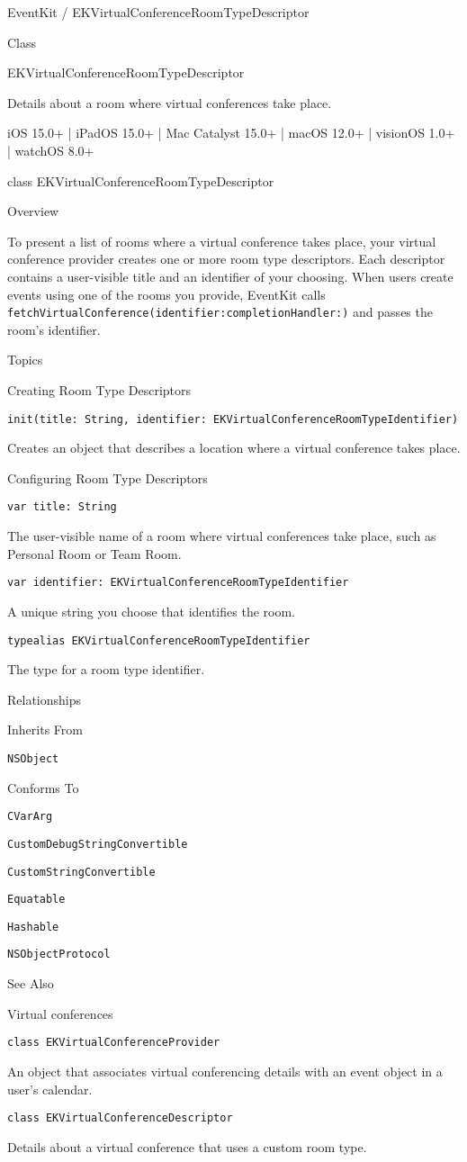 \documentclass{article}
\title{}
\author{}
\date{}
\begin{document}
EventKit / EKVirtualConferenceRoomTypeDescriptor

Class

EKVirtualConferenceRoomTypeDescriptor

Details about a room where virtual conferences take place.

iOS 15.0+ | iPadOS 15.0+ | Mac Catalyst 15.0+ | macOS 12.0+ | visionOS 1.0+ | watchOS 8.0+

class EKVirtualConferenceRoomTypeDescriptor

Overview

To present a list of rooms where a virtual conference takes place, your virtual conference provider creates one or more room type descriptors. Each descriptor contains a user-visible title and an identifier of your choosing. When users create events using one of the rooms you provide, EventKit calls \texttt{fetchVirtualConference(identifier:completionHandler:)} and passes the room's identifier.

Topics

Creating Room Type Descriptors

\texttt{init(title: String, identifier: EKVirtualConferenceRoomTypeIdentifier)}

Creates an object that describes a location where a virtual conference takes place.

Configuring Room Type Descriptors

\texttt{var title: String}

The user-visible name of a room where virtual conferences take place, such as Personal Room or Team Room.

\texttt{var identifier: EKVirtualConferenceRoomTypeIdentifier}

A unique string you choose that identifies the room.

\texttt{typealias EKVirtualConferenceRoomTypeIdentifier}

The type for a room type identifier.

Relationships

Inherits From

\texttt{NSObject}

Conforms To

\texttt{CVarArg}

\texttt{CustomDebugStringConvertible}

\texttt{CustomStringConvertible}

\texttt{Equatable}

\texttt{Hashable}

\texttt{NSObjectProtocol}

See Also

Virtual conferences

\texttt{class EKVirtualConferenceProvider}

An object that associates virtual conferencing details with an event object in a user's calendar.

\texttt{class EKVirtualConferenceDescriptor}

Details about a virtual conference that uses a custom room type.

\newpage
\end{document}
